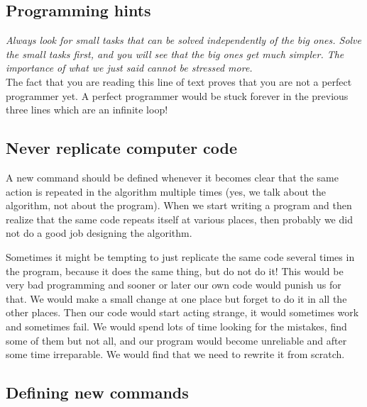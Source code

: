 \documentclass[article,A4,12pt]{llncs}
\begin{document}
\subsection{Programming hints}

{\em Always look for small tasks that can be solved independently of the big ones.
Solve the small tasks first, and you will see that the big ones get much simpler. The 
importance of what we just said cannot be stressed more.}\\

\noindent
The fact that you are reading this line of text proves that you are not 
a perfect programmer yet. A perfect programmer would be stuck forever 
in the previous three lines which are an infinite loop!


\subsection{Never replicate computer code}

A new command should be defined whenever it becomes clear that the same 
action is repeated in the algorithm multiple times (yes, we talk about the algorithm,
not about the program). When we start writing a program and then realize that the same
code repeats itself at various places, then probably we did not do a good job 
designing the algorithm.

Sometimes it might be 
tempting to just replicate the same code several times in the 
program, because it does the same thing, but do not do it! This would be very bad programming
and sooner or later our own code would punish us for that. 
We would make a small change at one place but forget to do it 
in all the other places. Then our code would start 
acting strange, it would sometimes work and sometimes fail. 
We would spend lots of time looking for the mistakes, find some 
of them but not all, and our program would become unreliable
and after some time irreparable. We would find that we need to 
rewrite it from scratch.

\subsection{Defining new commands}
\end{document}
